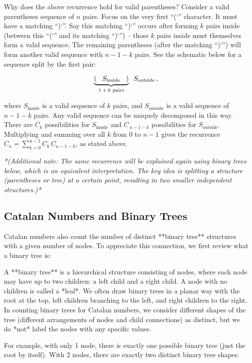 \documentclass{article}
\begin{document}
Why does the above recurrence hold for valid parentheses? Consider a valid parentheses sequence of $n$ pairs. Focus on the very first “(`” character. It must have a matching “)`”. Say this matching “)`” occurs after forming $k$ pairs inside (between this “(`” and its matching “)`”) – those $k$ pairs inside must themselves form a valid sequence. The remaining parentheses (after the matching “)`”) will form another valid sequence with $n-1-k$ pairs. See the schematic below for a sequence split by the first pair:

\[
\underbrace{\vphantom{()}( \;\;\; S_{\text{inside}} \;\;\; )}_{\text{$1+k$ pairs}} \;\; S_{\text{outside}}\,,
\] 

where $S_{\text{inside}}$ is a valid sequence of $k$ pairs, and $S_{\text{outside}}$ is a valid sequence of $n-1-k$ pairs. Any valid sequence can be uniquely decomposed in this way. There are $C_k$ possibilities for $S_{\text{inside}}$ and $C_{\,n-1-k}$ possibilities for $S_{\text{outside}}$. Multiplying and summing over all $k$ from $0$ to $n-1$ gives the recurrence $C_n = \sum_{k=0}^{n-1} C_k\,C_{n-1-k}$, as stated above.

\textit{*(Additional note: The same recurrence will be explained again using binary trees below, which is an equivalent interpretation. The key idea is splitting a structure (parentheses or tree) at a certain point, resulting in two smaller independent structures.)*}

\subsection{Catalan Numbers and Binary Trees}

Catalan numbers also count the number of distinct **binary tree** structures with a given number of nodes. To appreciate this connection, we first review what a binary tree is:

A **binary tree** is a hierarchical structure consisting of nodes, where each node may have up to two children: a left child and a right child. A node with no children is called a *leaf*. We often draw binary trees in a planar way with the root at the top, left children branching to the left, and right children to the right. In counting binary trees for Catalan numbers, we consider different shapes of the tree (different arrangements of nodes and child connections) as distinct, but we do *not* label the nodes with any specific values.

For example, with only 1 node, there is exactly one possible binary tree (just the root by itself). With 2 nodes, there are exactly two distinct binary tree shapes:
\end{document}
